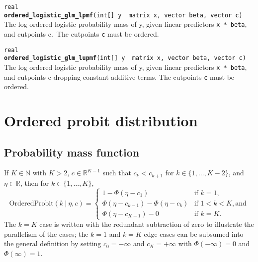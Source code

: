 \documentclass[
  10pt,
]{book}
\begin{document}

\texttt{real} \textbf{\texttt{ordered\_logistic\_glm\_lpmf}}\texttt{(int{[}{]}\ y\ \textbar{}\ matrix\ x,\ vector\ beta,\ vector\ c)}\newline
The log ordered logistic probability mass of y, given linear predictors
\texttt{x\ *\ beta}, and cutpoints c.~The cutpoints \texttt{c} must be ordered.


\texttt{real} \textbf{\texttt{ordered\_logistic\_glm\_lupmf}}\texttt{(int{[}{]}\ y\ \textbar{}\ matrix\ x,\ vector\ beta,\ vector\ c)}\newline
The log ordered logistic probability mass of y, given linear predictors
\texttt{x\ *\ beta}, and cutpoints c dropping constant additive terms. The cutpoints \texttt{c}
must be ordered.

\hypertarget{ordered-probit-distribution}{%
\section{Ordered probit distribution}\label{ordered-probit-distribution}}

\hypertarget{probability-mass-function-9}{%
\subsection{Probability mass function}\label{probability-mass-function-9}}

If \(K \in \mathbb{N}\) with \(K > 2\), \(c \in \mathbb{R}^{K-1}\) such that
\(c_k < c_{k+1}\) for \(k \in \{1,\ldots,K-2\}\), and \(\eta \in \mathbb{R}\), then for \(k \in \{1,\ldots,K\}\), \[
\text{OrderedProbit}(k~|~\eta,c) = \left\{ \begin{array}{ll} 1 -
\Phi(\eta - c_1) & \text{if } k = 1, \\[4pt] \Phi(\eta - c_{k-1}) -
\Phi(\eta - c_{k})  & \text{if } 1 < k < K, \text{and} \\[4pt]
\Phi(\eta - c_{K-1}) - 0 & \text{if } k = K. \end{array} \right. \]
The \(k=K\) case is written with the redundant subtraction of zero to
illustrate the parallelism of the cases; the \(k=1\) and \(k=K\) edge
cases can be subsumed into the general definition by setting \(c_0 = -\infty\) and \(c_K = +\infty\) with \(\Phi(-\infty) = 0\) and
\(\Phi(\infty) = 1\).
\end{document}
